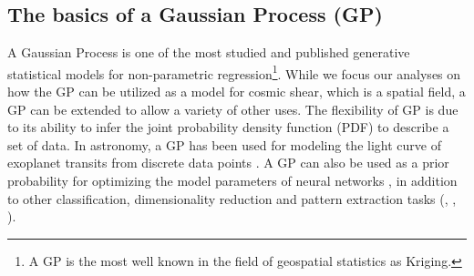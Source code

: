 \subsection{The basics of a Gaussian Process (GP)}
A Gaussian Process is one of the most studied and published 
generative statistical models for non-parametric regression\footnote{
A GP is the most well known in the field of geospatial statistics as Kriging. 
}. 
While we focus our analyses on how the GP can be utilized as a model 
for cosmic shear, which is a spatial field, a GP can be extended to 
allow a variety of other uses. 
The flexibility of GP is due to its ability to infer 
the joint probability density 
function (PDF) to describe a set of data. 
In astronomy, a GP has been used for modeling 
the light curve of exoplanet transits from discrete data points
\citep{Ambikasaran2014a}. 
A GP can also be used as a prior probability for optimizing the 
model parameters of neural networks \citep{Snoek2012}, in addition to 
other classification, dimensionality reduction 
and pattern extraction tasks
(\citealt{Wilson2013}, \citealt{Duvenaud2013}, \citealt{Rasmussen2006}).
 
